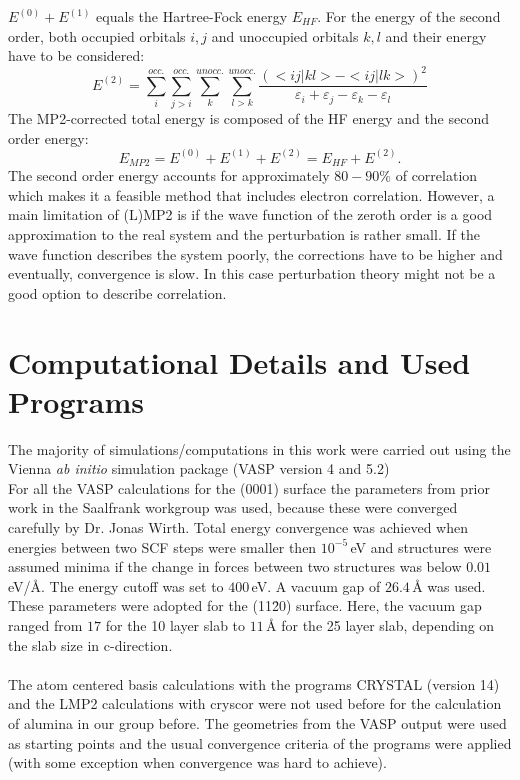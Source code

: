 \documentclass[11pt,DIV=13,BCOR=5mm,a4paper,headinclude]{scrbook}
\begin{document}
$E^{(0)}+E^{(1)}$ equals the Hartree-Fock energy $E_{HF}$.
For the energy of the second order, both occupied orbitals $i,j$ and unoccupied orbitals $k,l$ and their energy have to be considered:
\begin{equation}
 E^{(2)}=\sum\limits_{i}^{occ.}\sum\limits_{j>i}^{occ.}\sum\limits_{k}^{unocc.}\sum\limits_{l>k}^{unocc.} \frac{(<ij|kl> - <ij|lk>)^2}{\varepsilon_i + \varepsilon_j - \varepsilon_k - \varepsilon_l}
\end{equation}
The MP2-corrected total energy is composed of the HF energy and the second order energy:
\begin{equation}
 E_{MP2} = E^{(0)}+E^{(1)} + E^{(2)} = E_{HF} + E^{(2)}.
\end{equation}
The second order energy accounts for approximately $80-90\%$ of correlation which makes it a feasible method that includes electron correlation.
However, a main limitation of (L)MP2 is if the wave function of the zeroth order is a good approximation to the real system and the perturbation is rather small.
If the wave function describes the system poorly, the corrections have to be higher and eventually, convergence is slow.
In this case perturbation theory might not be a good option to describe correlation.

\section{Computational Details and Used Programs}
The majority of simulations/computations in this work were carried out using the Vienna \textit{ab initio} simulation package (VASP version 4 and 5.2)\cite{kresse1993,kresse2,kresse3,kresse4,kresse99}
\\
For all the VASP calculations for the (0001) surface the parameters from prior work in the Saalfrank workgroup was used, because these were converged carefully by Dr. Jonas Wirth\cite{WirthJPCC2012,Wirth2014,Wirth2015,Wirth2016}.
Total energy convergence was achieved when energies between two SCF steps were smaller then $10^{-5}\,$eV and structures were assumed minima if the change in forces between two structures was below $0.01\,$eV/\AA{}.
The energy cutoff was set to $400\,$eV.
A vacuum gap of $26.4\,$\AA{} was used.
\\
These parameters were adopted for the (11\=20) surface.
Here, the vacuum gap ranged from $17$ for the 10 layer slab to $11\,$\AA{} for the 25 layer slab, depending on the slab size in c-direction.
\\\\
The atom centered basis calculations with the programs CRYSTAL\cite{crystal14} (version 14) and the LMP2 calculations with cryscor\cite{cryscor} were not used before for the calculation of alumina in our group before.
The geometries from the VASP output were used as starting points and the usual convergence criteria of the programs were applied (with some exception when convergence was hard to achieve).
\end{document}
